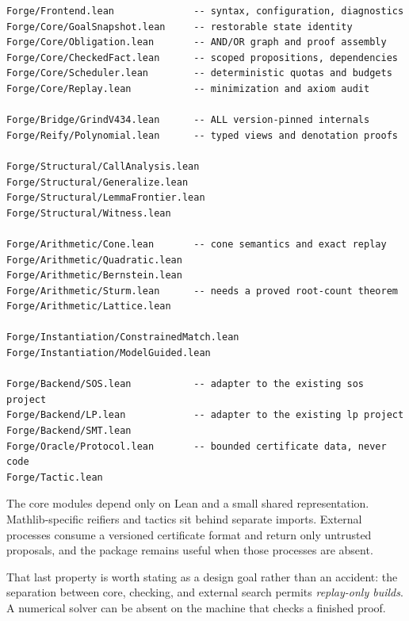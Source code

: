 \begin{lstlisting}
Forge/Frontend.lean              -- syntax, configuration, diagnostics
Forge/Core/GoalSnapshot.lean     -- restorable state identity
Forge/Core/Obligation.lean       -- AND/OR graph and proof assembly
Forge/Core/CheckedFact.lean      -- scoped propositions, dependencies
Forge/Core/Scheduler.lean        -- deterministic quotas and budgets
Forge/Core/Replay.lean           -- minimization and axiom audit

Forge/Bridge/GrindV434.lean      -- ALL version-pinned internals
Forge/Reify/Polynomial.lean      -- typed views and denotation proofs

Forge/Structural/CallAnalysis.lean
Forge/Structural/Generalize.lean
Forge/Structural/LemmaFrontier.lean
Forge/Structural/Witness.lean

Forge/Arithmetic/Cone.lean       -- cone semantics and exact replay
Forge/Arithmetic/Quadratic.lean
Forge/Arithmetic/Bernstein.lean
Forge/Arithmetic/Sturm.lean      -- needs a proved root-count theorem
Forge/Arithmetic/Lattice.lean

Forge/Instantiation/ConstrainedMatch.lean
Forge/Instantiation/ModelGuided.lean

Forge/Backend/SOS.lean           -- adapter to the existing sos project
Forge/Backend/LP.lean            -- adapter to the existing lp project
Forge/Backend/SMT.lean
Forge/Oracle/Protocol.lean       -- bounded certificate data, never code
Forge/Tactic.lean
\end{lstlisting}

The core modules depend only on Lean and a small shared representation.
Mathlib-specific reifiers and tactics sit behind separate imports. External
processes consume a versioned certificate format and return only untrusted
proposals, and the package remains useful when those processes are absent.

That last property is worth stating as a design goal rather than an accident:
the separation between core, checking, and external search permits
\emph{replay-only builds}. A numerical solver can be absent on the machine that
checks a finished proof.

